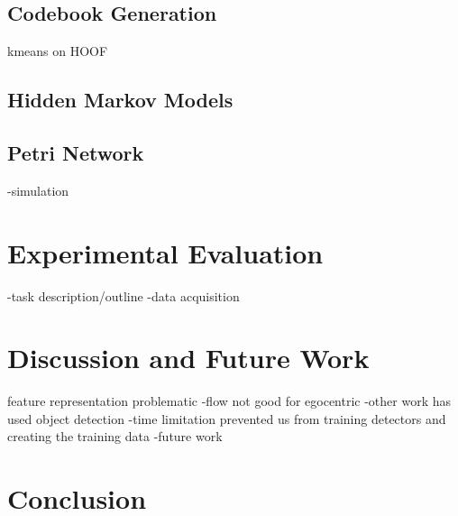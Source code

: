\documentclass[10pt,twocolumn,letterpaper]{article}
\begin{document}
\subsection{Codebook Generation}
kmeans on HOOF


\subsection{Hidden Markov Models}


\subsection{Petri Network}
-simulation

\section{Experimental Evaluation}

-task description/outline
-data acquisition

\section{Discussion and Future Work}

feature representation problematic
-flow not good for egocentric
-other work has used object detection
	-time limitation prevented us from training detectors and creating the training data
	-future work


\section{Conclusion}



{\small


}
\end{document}
